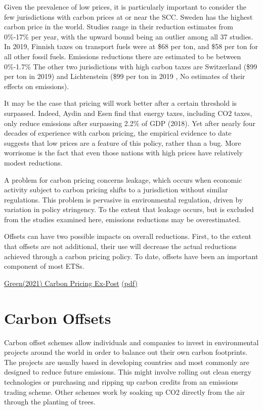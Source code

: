 \documentclass[
]{book}
\begin{document}
Given the prevalence of low prices, it is particularly important to consider the few jurisdictions
with carbon prices at or near the SCC.
Sweden has the highest carbon price in the world.
Studies range in their reduction estimates from 0\%-17\% per year, with the upward
bound being an outlier among all 37 studies.
In 2019, Finnish taxes on transport fuels were at \$68 per ton, and \$58 per ton for
all other fossil fuels.
Emissions reductions there are estimated to be between 0\%-1.7\%
The other two jurisdictions with high carbon taxes are
Switzerland (\$99 per ton in 2019) and Lichtenstein (\$99 per ton in 2019
, No estimates of their effects on emissions).

It may be the case that pricing will work better after a certain threshold is surpassed. Indeed,
Aydin and Esen find that energy taxes, including CO2 taxes, only reduce emissions after
surpassing 2.2\% of GDP (2018). Yet after nearly four decades of experience with carbon pricing,
the empirical evidence to date suggests that low prices are a feature of this policy, rather than a
bug. More worrisome is the fact that even those nations with high prices have relatively
modest reductions.

A problem for carbon pricing concerns leakage, which occurs when economic
activity subject to carbon pricing shifts to a jurisdiction without similar regulations. This
problem is pervasive in environmental regulation, driven by variation in policy stringency.
To the extent that leakage occurs, but is excluded from the studies examined here, emissions
reductions may be overestimated.

Offsets can have two possible impacts on overall reductions. First, to the extent that offsets are
not additional, their use will decrease the actual reductions achieved through a carbon pricing
policy.
To date, offsets have been an important component of most ETSs.

\href{https://iopscience.iop.org/article/10.1088/1748-9326/abdae9/meta}{Green(2021) Carbon Pricing Ex-Post}
\href{pdf/Green_2021_Carbon_Pricing_Ex-Post.pdf}{(pdf)}

\hypertarget{carbon-offsets}{%
\chapter{Carbon Offsets}\label{carbon-offsets}}

Carbon offset schemes allow individuals and companies to invest in environmental projects around the world in order to balance out their own carbon footprints. The projects are usually based in developing countries and most commonly are designed to reduce future emissions. This might involve rolling out clean energy technologies or purchasing and ripping up carbon credits from an emissions trading scheme. Other schemes work by soaking up CO2 directly from the air through the planting of trees.
\end{document}
